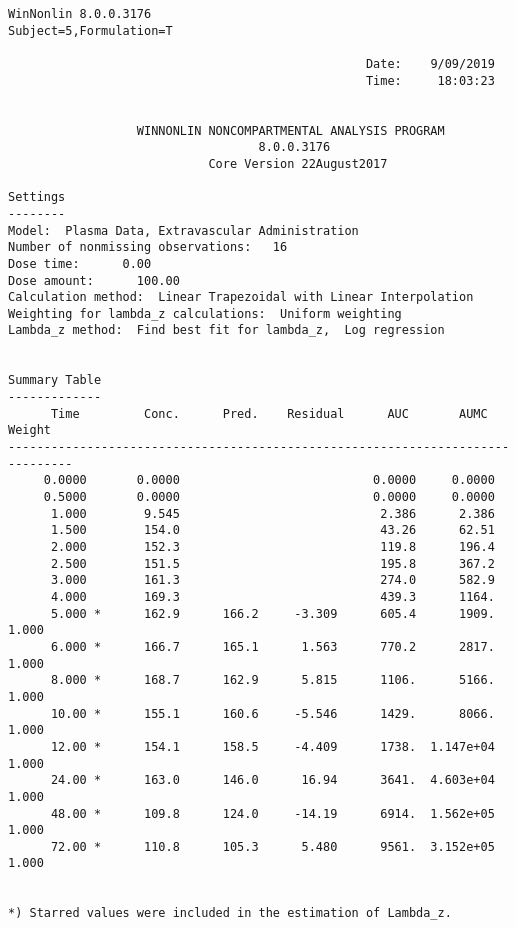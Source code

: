 \documentclass[12pt,a4paper]{article}
\begin{document}
\begin{verbatim}
WinNonlin 8.0.0.3176
Subject=5,Formulation=T

                                                  Date:    9/09/2019
                                                  Time:     18:03:23


                  WINNONLIN NONCOMPARTMENTAL ANALYSIS PROGRAM
                                   8.0.0.3176
                            Core Version 22August2017

Settings
--------
Model:  Plasma Data, Extravascular Administration
Number of nonmissing observations:   16
Dose time:      0.00
Dose amount:      100.00
Calculation method:  Linear Trapezoidal with Linear Interpolation
Weighting for lambda_z calculations:  Uniform weighting
Lambda_z method:  Find best fit for lambda_z,  Log regression


Summary Table
-------------
      Time         Conc.      Pred.    Residual      AUC       AUMC      Weight
-------------------------------------------------------------------------------
     0.0000       0.0000                           0.0000     0.0000
     0.5000       0.0000                           0.0000     0.0000
      1.000        9.545                            2.386      2.386
      1.500        154.0                            43.26      62.51
      2.000        152.3                            119.8      196.4
      2.500        151.5                            195.8      367.2
      3.000        161.3                            274.0      582.9
      4.000        169.3                            439.3      1164.
      5.000 *      162.9      166.2     -3.309      605.4      1909.      1.000
      6.000 *      166.7      165.1      1.563      770.2      2817.      1.000
      8.000 *      168.7      162.9      5.815      1106.      5166.      1.000
      10.00 *      155.1      160.6     -5.546      1429.      8066.      1.000
      12.00 *      154.1      158.5     -4.409      1738.  1.147e+04      1.000
      24.00 *      163.0      146.0      16.94      3641.  4.603e+04      1.000
      48.00 *      109.8      124.0     -14.19      6914.  1.562e+05      1.000
      72.00 *      110.8      105.3      5.480      9561.  3.152e+05      1.000


*) Starred values were included in the estimation of Lambda_z.



\end{verbatim}
\end{document}
